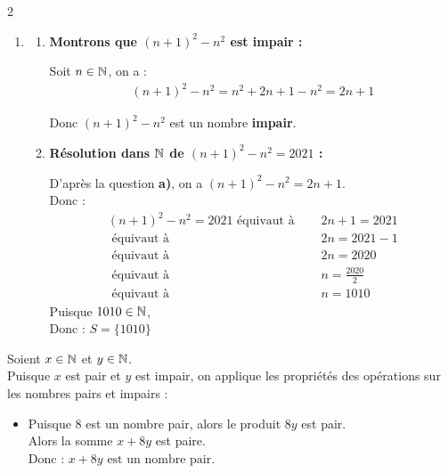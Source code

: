\documentclass[10pt, a4paper]{article}
\begin{document}
\begin{multicols*}{2}
\begin{Solution}[APPLICATION][1]
\begin{enumerate}[leftmargin=*,itemsep=0.5pt]
\begin{itemize}[leftmargin=*,itemsep=0.5pt]
    Posons $k = 2n^2 + 3n + 3 \in \N$ \\
    Donc $D = 2k + 1$ avec $k \in \N$. \\
    Donc  $D$ est un nombre \textbf{impair}.
    \end{itemize}

    \item
    \begin{enumerate}[leftmargin=*,itemsep=0.5pt]
        \item \textbf{Montrons que $(n+1)^2 - n^2$ est impair :}

        Soit $n \in \mathbb{N}$,  on a :
        \begin{align*}
            (n+1)^2 - n^2 = n^2 + 2n + 1 - n^2
                          = 2n + 1
        \end{align*}

        Donc $(n+1)^2 - n^2$ est un nombre \textbf{impair}.

        \item \textbf{Résolution dans $\mathbb{N}$ de $(n+1)^2 - n^2 = 2021$ :}

        D'après la question \textbf{a)}, on a $(n+1)^2 - n^2 = 2n + 1$. \\
        Donc :
        \begin{align*}
            (n+1)^2 - n^2 = 2021
            \text{ équivaut à } \quad & 2n + 1 = 2021 \\
            \text{ équivaut à } \quad & 2n = 2021 - 1 \\
            \text{ équivaut à } \quad & 2n = 2020 \\
            \text{ équivaut à } \quad & n = \frac{2020}{2} \\
            \text{ équivaut à } \quad & n = 1010
        \end{align*}
        Puisque $1010 \in \mathbb{N}$, \\
        Donc : \quad $S = \big\{1010\big\}$

    \end{enumerate}
\end{enumerate}
\end{Solution}

\begin{Solution}[APPLICATION][2]
Soient $x \in \mathbb{N}$ et $y \in \mathbb{N}$. \\
Puisque $x$ est pair et $y$ est impair, on applique les propriétés des opérations sur les nombres pairs et impairs :
\begin{itemize}[leftmargin=*,itemsep=0.5pt]
    \item Puisque $8$ est un nombre pair, alors le produit $8y$ est pair. \\
    Alors la somme $x + 8y$ est paire. \\
    Donc : \quad $x + 8y \text{ est un nombre pair.}$


\end{itemize}
\end{Solution}
\end{multicols*}
\end{document}
